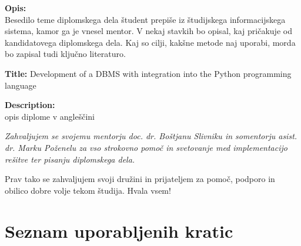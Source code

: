 \documentclass[a4paper,12pt,openright]{book}
\newcommand{\ttitleEn}{Development of a DBMS with integration into the Python programming language}
\newcommand{\clearemptydoublepage}{\newpage{\pagestyle{empty}\cleardoublepage}}
\begin{document}
\bigskip
\noindent\textbf{Opis:}\\
Besedilo teme diplomskega dela študent prepiše iz študijskega informacijskega sistema, kamor ga je vnesel mentor. 
V nekaj stavkih bo opisal, kaj pričakuje od kandidatovega diplomskega dela. 
Kaj so cilji, kakšne metode naj uporabi, morda bo zapisal tudi ključno literaturo.

\bigskip
\noindent\textbf{Title:} \ttitleEn

\bigskip
\noindent\textbf{Description:}\\
opis diplome v angleščini

\vfill



\vspace{2cm}

\clearemptydoublepage

\thispagestyle{empty}\mbox{}\vfill\null\it%
\noindent
Zahvaljujem se svojemu mentorju doc. dr. Boštjanu Slivniku in somentorju asist. dr. Marku Poženelu za vso strokovno pomoč in svetovanje med implementacijo rešitve ter pisanju diplomskega dela.

Prav tako se zahvaljujem svoji družini in prijateljem za pomoč, podporo in obilico dobre volje tekom študija.
\noindent
Hvala vsem!
\rm\normalfont

\clearemptydoublepage


\clearemptydoublepage


\setcounter{tocdepth}{2}
\pagestyle{empty}
\def\thepage{}%
\tableofcontents{}


\clearemptydoublepage


\chapter*{Seznam uporabljenih kratic}
\end{document}
